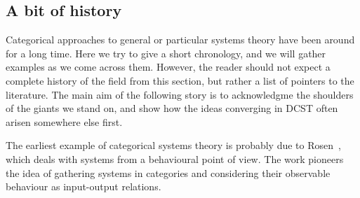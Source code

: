 

\subsection{A bit of history}
Categorical approaches to general or particular systems theory have been around for a long time.
Here we try to give a short chronology, and we will gather examples as we come across them.
However, the reader should not expect a complete history of the field from this section, but rather a list of pointers to the literature.
The main aim of the following story is to acknowledgme the shoulders of the giants we stand on, and show how the ideas converging in DCST often arisen somewhere else first.

The earliest example of categorical systems theory is probably due to Rosen~\cite{rosen1978fundamentals}, which deals with systems from a behavioural point of view.
The work pioneers the idea of gathering systems in categories and considering their observable behaviour as input-output relations.

